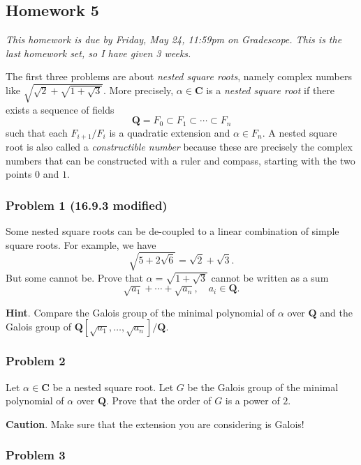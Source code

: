 \documentclass[11pt]{article}
\begin{document}
\subsection{Homework 5}
\label{sec:orgf39d071}
\emph{This homework is due by Friday, May 24, 11:59pm on Gradescope.  This is the last homework set, so I have given 3 weeks.}
\bigskip

The first three problems are about \emph{nested square roots}, namely complex numbers like \(\sqrt{\sqrt 2 + \sqrt{1 + \sqrt 3}}\).
More precisely, \(\alpha \in \mathbf{C}\) is a \emph{nested square root} if there exists a sequence of fields
\[ \mathbf{Q} = F_0 \subset F_1 \subset \cdots \subset F_n\]
such that each \(F_{i+1}/F_{i}\) is a quadratic extension and \(\alpha \in F_{n}\).
A nested square root is also called a \emph{constructible number} because these are precisely the complex numbers that can be constructed with a ruler and compass, starting with the two points \(0\) and \(1\).
\subsubsection{Problem 1  (16.9.3 modified)}
\label{sec:orgbf4b4fd}

Some nested square roots can be de-coupled to a linear combination of simple square roots.
For example, we have
\[ \sqrt {5 + 2\sqrt 6} = \sqrt 2 + \sqrt 3.\]
But some cannot be.
Prove that \(\alpha = \sqrt{1 + \sqrt 3}\) cannot be written as a sum
\[ \sqrt{a_{1}} + \cdots + \sqrt{a_{n}}, \quad a_i \in \mathbf{Q}.\]

\textbf{Hint}. Compare the Galois group of the minimal polynomial of \(\alpha\) over \(\mathbf{Q}\) and the Galois group of \(\mathbf{Q}[\sqrt{a_1}, \dots, \sqrt{a_n}] / \mathbf{Q}.\)
\subsubsection{Problem 2}
\label{sec:org0575e85}

Let \(\alpha \in \mathbf{C}\) be a nested square root.
Let \(G\) be the Galois group of the minimal polynomial of \(\alpha\) over \(\mathbf{Q}\).
Prove that the order of \(G\) is a power of \(2\).

\textbf{Caution}. Make sure that the extension you are considering is Galois!
\subsubsection{Problem 3}
\label{sec:org5e67440}
\end{document}
